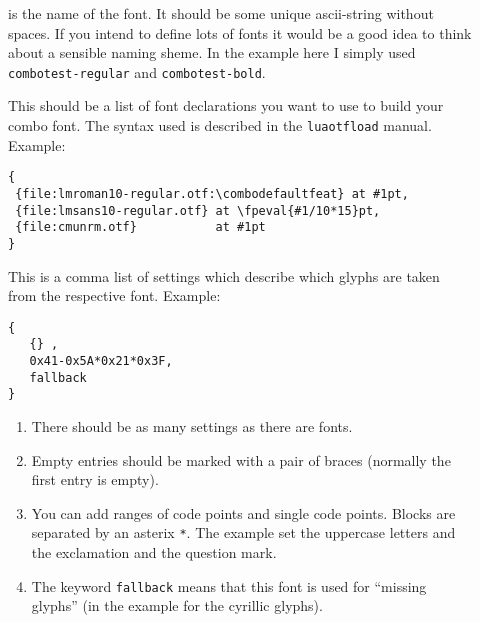 \documentclass[parskip=half-,egregdoesnotlikesansseriftitles]{scrartcl}
\newcommand\package[1]{\texttt{#1}}
\begin{document}
\begin{description}
  \item[] is the name of the font. It should be some unique ascii-string without spaces. If you intend to define lots of fonts it would be a good idea to think about a sensible naming sheme. In the example here I simply used \texttt{combotest-regular} and \texttt{combotest-bold}.

  \item[] This should be a list of font declarations you want to use to build your combo font. The syntax used is described in the \package{luaotfload} manual. Example:

\begin{verbatim}
{
 {file:lmroman10-regular.otf:\combodefaultfeat} at #1pt,
 {file:lmsans10-regular.otf} at \fpeval{#1/10*15}pt,
 {file:cmunrm.otf}           at #1pt
}
\end{verbatim}


\item[] This is a comma list of settings which describe which glyphs are taken from the respective font. Example:

\begin{verbatim}
{
   {} ,
   0x41-0x5A*0x21*0x3F,
   fallback
}
\end{verbatim}

\begin{enumerate}
\item There should be as many settings as there are fonts.
\item Empty entries should be marked with a pair of braces (normally the first entry is empty).
\item You can add ranges of code points and single code points. Blocks are separated by an asterix \verb+*+. The example set the uppercase letters and the exclamation and the question mark.
\item The keyword \texttt{fallback} means that this font is used for \enquote{missing glyphs} (in the example for the cyrillic glyphs).
\end{enumerate}
\end{description}
\end{document}
